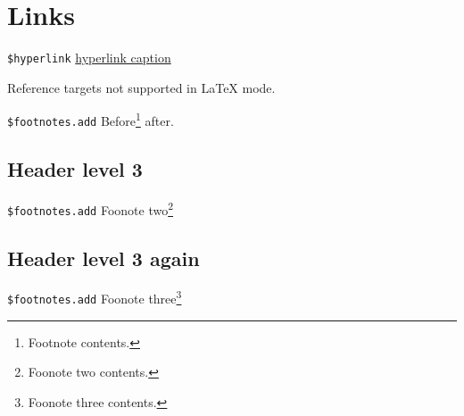 \documentclass[demo]{pyscribe}
\begin{document}
\section{Links}

\par\medskip
\texttt{\$hyperlink} \href{https://example.org}{hyperlink caption}

Reference targets not supported in LaTeX mode.

\par\medskip
\texttt{\$footnotes.add} Before\footnote{Footnote contents.} after.

\subsection{Header level 3}
\par\medskip
\texttt{\$footnotes.add} Foonote two\footnote{Foonote two contents.}

\subsection{Header level 3 again}
\par\medskip
\texttt{\$footnotes.add} Foonote three\footnote{Foonote three contents.}
\end{document}
